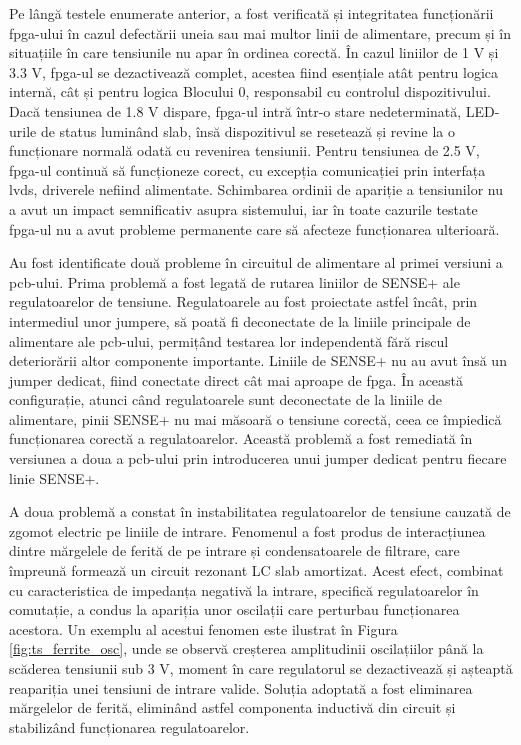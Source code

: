\documentclass[12pt,a4paper]{report}
\begin{document}
Pe lângă testele enumerate anterior, a fost verificată și integritatea funcționării \gls{fpga}-ului în cazul defectării uneia sau mai multor linii de alimentare, precum și în situațiile în care tensiunile nu apar în ordinea corectă. În cazul liniilor de 1 V și 3.3 V, \gls{fpga}-ul se dezactivează complet, acestea fiind esențiale atât pentru logica internă, cât și pentru logica Blocului 0, responsabil cu controlul dispozitivului. Dacă tensiunea de 1.8 V dispare, \gls{fpga}-ul intră într-o stare nedeterminată, LED-urile de status luminând slab, însă dispozitivul se resetează și revine la o funcționare normală odată cu revenirea tensiunii. Pentru tensiunea de 2.5 V, \gls{fpga}-ul continuă să funcționeze corect, cu excepția comunicației prin interfața \gls{lvds}, driverele nefiind alimentate. Schimbarea ordinii de apariție a tensiunilor nu a avut un impact semnificativ asupra sistemului, iar în toate cazurile testate \gls{fpga}-ul nu a avut probleme permanente care să afecteze funcționarea ulterioară.

Au fost identificate două probleme în circuitul de alimentare al primei versiuni a \gls{pcb}-ului. Prima problemă a fost legată de rutarea liniilor de SENSE+ ale regulatoarelor de tensiune. Regulatoarele au fost proiectate astfel încât, prin intermediul unor jumpere, să poată fi deconectate de la liniile principale de alimentare ale \gls{pcb}-ului, permițând testarea lor independentă fără riscul deteriorării altor componente importante. Liniile de SENSE+ nu au avut însă un jumper dedicat, fiind conectate direct cât mai aproape de \gls{fpga}. În această configurație, atunci când regulatoarele sunt deconectate de la liniile de alimentare, pinii SENSE+ nu mai măsoară o tensiune corectă, ceea ce împiedică funcționarea corectă a regulatoarelor. Această problemă a fost remediată în versiunea a doua a \gls{pcb}-ului prin introducerea unui jumper dedicat pentru fiecare linie SENSE+.

A doua problemă a constat în instabilitatea regulatoarelor de tensiune cauzată de zgomot electric pe liniile de intrare. Fenomenul a fost produs de interacțiunea dintre mărgelele de ferită de pe intrare și condensatoarele de filtrare, care împreună formează un circuit rezonant LC slab amortizat. Acest efect, combinat cu caracteristica de impedanța negativă la intrare, specifică regulatoarelor în comutație, a condus la apariția unor oscilații care perturbau funcționarea acestora. Un exemplu al acestui fenomen este ilustrat în Figura \ref{fig:ts_ferrite_osc}, unde se observă creșterea amplitudinii oscilațiilor până la scăderea tensiunii sub 3 V, moment în care regulatorul se dezactivează și așteaptă reapariția unei tensiuni de intrare valide. Soluția adoptată a fost eliminarea mărgelelor de ferită, eliminând astfel componenta inductivă din circuit și stabilizând funcționarea regulatoarelor.
\end{document}
